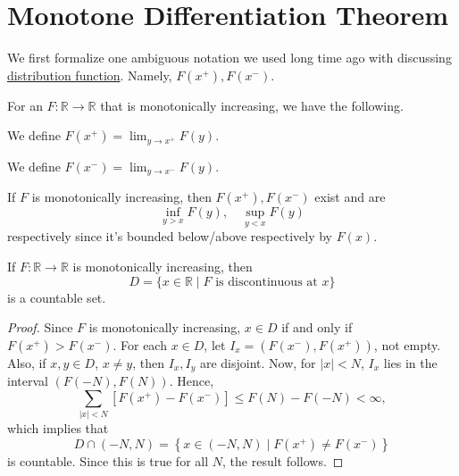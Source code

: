 \section{Monotone Differentiation Theorem}
We first formalize one ambiguous notation we used long time ago with discussing \hyperref[def:distribution-function]{distribution function}. Namely, \(F(x^+), F(x^-)\).

\begin{definition*}
	For an \(F \colon  \mathbb{R} \to \mathbb{R}\) that is monotonically increasing, we have the following.
	\begin{definition}[\(F(x^+)\)]\label{def:x-plus}
		We define \(F(x^+) = \lim_{y \to x^+} F(y)\).
	\end{definition}
	\begin{definition}[\(F(x^-)\)]\label{def:x-minus}
		We define \(F(x^-) = \lim_{y \to x^-} F(y)\).
	\end{definition}
\end{definition*}

\begin{remark}
	If \(F\) is monotonically increasing, then \(F(x^+), F(x^-)\) exist and are
	\[
		\inf_{y > x} F(y),\quad \sup_{y < x} F(y)
	\]
	respectively since it's bounded below/above respectively by \(F(x)\).
\end{remark}

\begin{lemma}\label{lma:lec-33}
	If \(F\colon \mathbb{R} \to \mathbb{R} \) is monotonically increasing, then
	\[
		D = \{x\in \mathbb{R}  \mid F \text{ is discontinuous at } x\}
	\]
	is a countable set.
\end{lemma}
\begin{proof}
	Since \(F\) is monotonically increasing, \(x \in D\) if and only if \(F(x^+) > F(x^-)\). For each \(x \in D\), let \(I_x = (F(x^-),F(x^+))\), not empty.
	Also, if \(x,y \in D\), \(x \neq y\), then \(I_x,I_y\) are disjoint. Now, for \(\left\vert x \right\vert < N\), \(I_x\) lies in the interval
	\((F(-N), F(N))\). Hence,
	\[
		\sum_{\left\vert x \right\vert < N}\left[F(x^+) - F(x^-)\right] \leq F(N) - F(-N) <\infty,
	\]
	which implies that
	\[
		D \cap (-N, N) = \left\{x\in (-N, N) \mid F(x^+) \neq F(x^-)\right\}
	\]
	is countable. Since this is true for all \(N\), the result follows.
\end{proof}

